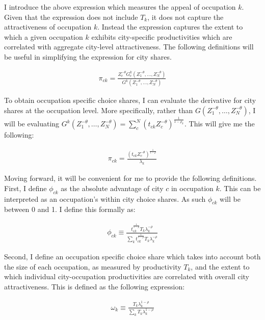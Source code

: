 \documentclass[10pt]{article}
\begin{document}
I introduce the above expression which measures the appeal of occupation $k$. Given that the expression does not include $T_k$, it does not capture the attractiveness of occupation $k$. Instead the expression captures the extent to which a given occupation $k$ exhibits city-specific productivities which are correlated with aggregate city-level attractiveness. The following definitions will be useful in simplifying the expression for city shares.

\begin{align*}
    \pi_{ck} = \frac{Z_c^{- \theta} G_c^k(Z_1^{- \theta}, \dots, Z_N^{- \theta})}{G^k(Z_1^{- \theta}, \dots, Z_N^{- \theta})}
\end{align*}

To obtain occupation specific choice shares, I can evaluate the derivative for city shares at the occupation level. More specifically, rather than $G(Z_1^{- \theta}, \dots, Z_N^{- \theta})$, I will be evaluating $G^k(Z_1^{- \theta}, \dots, Z_N^{- \theta}) = \sum_{c}^{N} (t_{ck} Z_c^{- \theta})^{\frac{1}{1 - \rho_k}}$. This will give me the following:

\begin{align}
    \pi_{ck} = \frac{(t_{ck} Z_c^{-\theta})^{\frac{1}{1 - \rho}}}{\lambda_k}
    \label{city_occuaption_shares}
\end{align}

Moving forward, it will be convenient for me to provide the following definitions. First, I define $\phi_{ck}$ as the absolute advantage of city $c$ in occupation $k$. This can be interpreted as an occupation's within city choice shares. As such $\phi_{ck}$ will be between 0 and 1. I define this formally as:

\begin{align}
    \phi_{ck} \equiv \frac{{t^{\frac{1}{1-\rho}}_{ck}}{T_{k}}\lambda_{k}^{-\rho}}{\sum\limits_{k}{t^{\frac{1}{1-\rho}}_{ck}}{T_{k}}\lambda_{k}^{-\rho}}
    \label{occupation_by_city_shares}
\end{align}

Second, I define an occupation specific choice share which takes into account both the size of each occupation, as measured by productivity $T_k$, and the extent to which individual city-occupation productivities are correlated with overall city attractiveness. This is defined as the following expression:

\begin{align}
    \omega_k \equiv \frac{{T_{k}}\lambda_{k}^{1-\rho}}{\sum\limits_{k}{T_{k}}\lambda_{k}^{1-\rho}}
    \label{occupation_shares}
\end{align}
\end{document}
